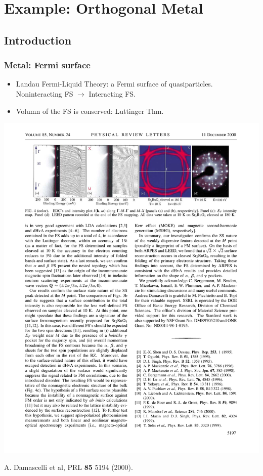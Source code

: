 \documentclass[xcolor=table, 10pt, aspectratio=43]{beamer}
\begin{document}
\section{Example: Orthogonal Metal}

\subsection{Introduction}


\begin{frame}
  \frametitle{Metal: Fermi surface}
\begin{itemize}
  \item Landau Fermi-Liquid Theory: a Fermi surface of quasiparticles.\\
  Noninteracting FS $\rightarrow$ Interacting FS.
  \item Volumn of the FS is conserved: Luttinger Thm.
\end{itemize}
\begin{center}
	\includegraphics{../resources/SrRuO_FS}

	{\small A. Damascelli et al, PRL \textbf{85} 5194 (2000).}
\end{center}
\end{frame}
\end{document}
